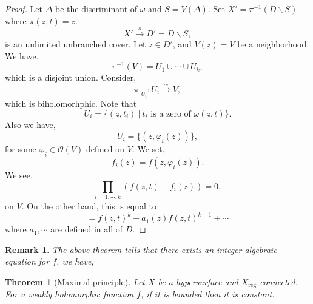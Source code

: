 \documentclass{article}
\newtheorem{theorem}{Theorem} [section]
\newtheorem{remark}{Remark}[section]
\DeclareMathOperator{\reg}{reg}
\newcommand{\sep}[0]{\:|\:}
\begin{document}
\begin{proof}
  Let $\Delta$ be the discriminant of $\omega$ and $S = V(\Delta)$. Set $X' = \pi^{-1}(D\backslash S)$ where $\pi(z,t) = z$.
  \begin{equation*}
    X'\stackrel{\pi}{\to}D' = D\backslash S,
  \end{equation*}
  is an unlimited unbranched cover. Let $z\in D'$, and $V(z)=V$ be a neighborhood. We have,
  \begin{equation*}
    \pi^{-1}(V) = U_1\cup\cdots\cup U_k,
  \end{equation*}
  which is a disjoint union. Consider,
  \begin{equation*}
    \pi|_{U_i}:U_i\stackrel{\sim}{\to}V,
  \end{equation*}
  which is biholomorhphic. Note that 
  \begin{equation*}
    U_i = \{(z,t_i)\sep t_i\text{ is a zero of }\omega(z,t)\}.
  \end{equation*}
  Also we have,
  \begin{equation*}
    U_i = \{(z,\varphi_i(z))\},
  \end{equation*}
  for some $\varphi_i\in\mathcal{O}(V)$ defined on $V$. We set,
  \begin{equation*}
    f_i(z) = f(z,\varphi_i(z)).
  \end{equation*}
  We see,
  \begin{equation*}
    \prod_{i=1,\cdots,k}(f(z,t) - f_i(z))=0,
  \end{equation*}
  on $V$. On the other hand, this is equal to 
  \begin{equation*}
    = f(z,t)^{k}+a_1(z)f(z,t)^{k-1}+\cdots
  \end{equation*}
  where $a_1,\cdots$ are defined in all of $D$.
\end{proof}

\begin{remark}
  The above theorem tells that there exists an integer algebraic equation for $f$. we have,
\end{remark}

\begin{theorem}[Maximal principle]
  \label{theorem_4_4}
  Let $X$ be a hypersurface and $X_{\reg}$ connected. For a weakly holomorphic function $f$, if it is bounded then it is constant.
\end{theorem}
\end{document}
